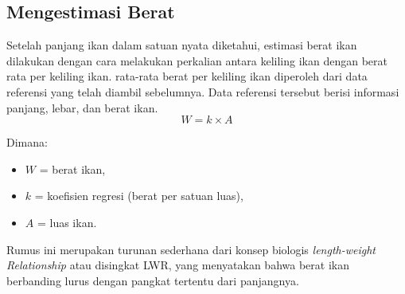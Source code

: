 \subsection{Mengestimasi Berat}
Setelah panjang ikan dalam satuan nyata diketahui, estimasi berat ikan dilakukan dengan cara melakukan perkalian antara keliling ikan dengan berat rata per keliling ikan.
rata-rata berat per keliling ikan diperoleh dari data referensi yang telah diambil sebelumnya. Data referensi tersebut berisi informasi panjang, lebar, dan berat ikan. 
\begin{equation}
    W = k \times A
\end{equation}

Dimana:
\begin{itemize}
    \item $W$ = berat ikan,
    \item $k$ = koefisien regresi (berat per satuan luas),
    \item $A$ = luas ikan.
\end{itemize}

Rumus ini merupakan turunan sederhana dari konsep biologis \emph{length-weight Relationship} atau disingkat LWR, yang menyatakan bahwa berat ikan berbanding lurus dengan pangkat tertentu dari panjangnya. 




